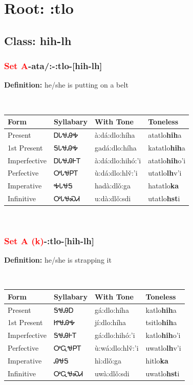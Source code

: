 \needspace{4in}
\section*{Root: :tlo}
\nopagebreak
{}
\needspace{3in}
\subsection*{Class: hih-lh}
\nopagebreak
\needspace{2in}
\subsubsection*{\textcolor{Red}{Set A}{-}ata/:{-}\textbf{:tlo}{-}[hih-lh]}
\nopagebreak
\textbf{Definition: } he/she is putting on a belt
\\[0.5em]
\begin{tabularx}{\textwidth}{l X X X}%
\toprule%
\textbf{Form}&\textbf{Syllabary}&\textbf{With Tone}&\textbf{Toneless}\\%
\midrule%
Present&ᎠᏓᏠᎯᎭ&à:dá:dlo:híha&atatlo\textbf{hih}a\\%
1st Present&ᎦᏓᏠᎯᎭ&gadá:dlo:híha&katatlo\textbf{hih}a\\%
Imperfective&ᎠᏓᏠᎯᎰᎢ&à:dá:dlo:hihó:’i&atatlo\textbf{hih}o'i\\%
Perfective&ᎤᏓᏠᏢᎢ&ù:dá:dlo:hlv̌:’i&utatlo\textbf{lh}v'i\\%
Imperative&ᎭᏓᏠᎦ&hadà:dlǒ:ga&hatatlo\textbf{ka}\\%
Infinitive&ᎤᏓᏠᏍᏗ&u:dà:dlǒ:sdi&utatlo\textbf{hst}i\\%
\bottomrule%
\end{tabularx}
\\[1em]
\needspace{2in}
\subsubsection*{\textcolor{Red}{Set A (k)}{-}\textbf{:tlo}{-}[hih-lh]}
\nopagebreak
\textbf{Definition: } he/she is strapping it
\\[0.5em]
\begin{tabularx}{\textwidth}{l X X X}%
\toprule%
\textbf{Form}&\textbf{Syllabary}&\textbf{With Tone}&\textbf{Toneless}\\%
\midrule%
Present&ᎦᏠᎯᎠ&gá:dlo:híha&katlo\textbf{hih}a\\%
1st Present&ᏥᏠᎯᎭ&jí:dlo:híha&tsitlo\textbf{hih}a\\%
Imperfective&ᎦᏠᎯᎰᎢ&gá:dlo:hihó:’i&katlo\textbf{hih}o'i\\%
Perfective&ᎤᏩᏠᏢᎢ&ù:wá:dlo:hlv̌:’i&uwatlo\textbf{lh}v'i\\%
Imperative&ᎯᏠᎦ&hì:dlǒ:ga&hitlo\textbf{ka}\\%
Infinitive&ᎤᏩᏠᏍᏗ&uwà:dlǒ:sdi&uwatlo\textbf{hst}i\\%
\bottomrule%
\end{tabularx}
\\[1em]